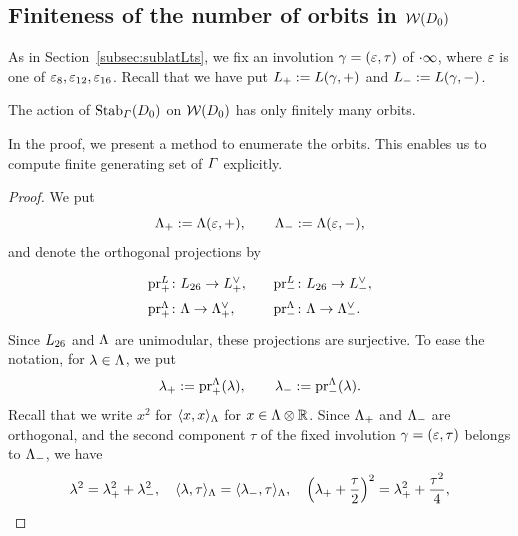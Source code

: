 \documentclass{amsart} %
\begin{document}
\subsection{Finiteness of the number of orbits in $\mathord{\mathcal{W}}(D_0)$}\label{subsec:finite}
%
As in Section~\ref{subsec:sublatLts}, 
we fix an involution $\gamma=(\varepsilon, \tau)$ of $\cdot \infty$,
where $\varepsilon$ is one of $\varepsilon_8, \varepsilon_{12}, \varepsilon_{16}$.
Recall that we have put $L_{+}:=L(\gamma, +)$
and $L_{-}:=L(\gamma, -)$.
%
\begin{theorem}
The action of $\operatorname{Stab}_{\varGamma}(D_0)$ on $\mathord{\mathcal{W}}(D_0)$ has only finitely many orbits.
\end{theorem}
%
In the proof,
we present a method to enumerate the orbits.
This enables us to compute finite generating set of $\varGamma$
explicitly.
%
\begin{proof}
We put
\[
\Lambda_{+}:=\Lambda(\varepsilon, +),
\qquad
\Lambda_{-}:=\Lambda(\varepsilon,-), 
\]
and denote the orthogonal projections by
%
\[
\renewcommand{\arraystretch}{1.5}
\begin{array}{lll}
\prLplus \colon\Lts\to \Lplus\dual, &&
\prLminus\colon \Lts\to \Lminus\dual,\\
\prLeechplus\colon \Leech\to \Leechplus\dual, &&
\prLeechminus\colon\Leech\to \Leechminus\dual.
\end{array}
\]
%
Since $L_{26}$ and $\Lambda$ are unimodular, 
these projections are surjective.
%
%
%
To ease the notation, for $\lambda\in \Lambda$, 
we put
\[
{\lambda}_{+}:=\operatorname{pr}^{\Lambda}_{+}(\lambda),
\qquad 
{\lambda}_{-}:=\operatorname{pr}^{\Lambda}_{-}(\lambda).
\]
Recall that we write $x^2$ for $\langle x, x \rangle_{\Lambda}$ for $x\in \Lambda\otimes\mathord{\mathbb{R}}$.
Since $\Lambda_{+}$ and $ \Lambda_{-}$ are orthogonal, and 
the second component $\tau$ of 
the fixed involution $\gamma=(\varepsilon, \tau)$ belongs to $ \Lambda_{-}$, 
we have 
\[
\lambda^2={\lambda}_{+}^2+{\lambda}_{-}^2,
\quad
\langle \lambda, \tau \rangle_{\Lambda}=\langle {\lambda}_{-}, \tau \rangle_{\Lambda}, 
\quad
\left({\lambda}_{+} +\frac{\tau}{2} \right)^2={\lambda}_{+}^2+\frac{\tau^2}{4}, 
\]
\end{proof}
\end{document}
